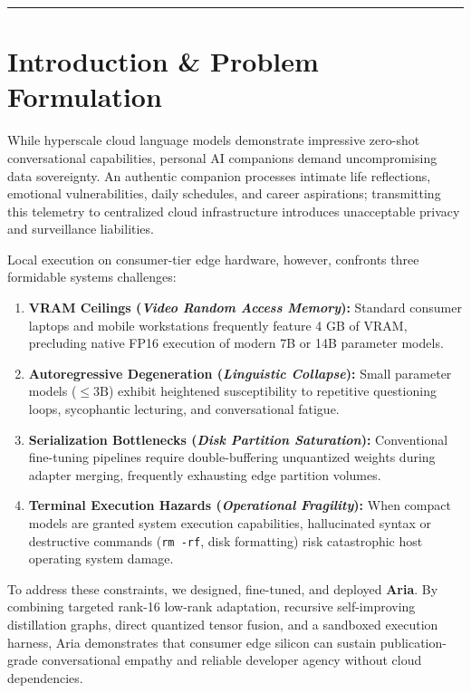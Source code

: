 \documentclass[10pt,a4paper]{article}
\begin{document}
\vspace{3pt}
\hrule
\vspace{5pt}

\section{Introduction \& Problem Formulation}

While hyperscale cloud language models demonstrate impressive zero-shot conversational capabilities, personal AI companions demand uncompromising data sovereignty. An authentic companion processes intimate life reflections, emotional vulnerabilities, daily schedules, and career aspirations; transmitting this telemetry to centralized cloud infrastructure introduces unacceptable privacy and surveillance liabilities. 

Local execution on consumer-tier edge hardware, however, confronts three formidable systems challenges:
\begin{enumerate}
    \item \textbf{VRAM Ceilings (\textit{Video Random Access Memory}):} Standard consumer laptops and mobile workstations frequently feature 4 GB of VRAM, precluding native FP16 execution of modern 7B or 14B parameter models.
    \item \textbf{Autoregressive Degeneration (\textit{Linguistic Collapse}):} Small parameter models ($\le 3\text{B}$) exhibit heightened susceptibility to repetitive questioning loops, sycophantic lecturing, and conversational fatigue.
    \item \textbf{Serialization Bottlenecks (\textit{Disk Partition Saturation}):} Conventional fine-tuning pipelines require double-buffering unquantized weights during adapter merging, frequently exhausting edge partition volumes.
    \item \textbf{Terminal Execution Hazards (\textit{Operational Fragility}):} When compact models are granted system execution capabilities, hallucinated syntax or destructive commands (\texttt{rm -rf}, disk formatting) risk catastrophic host operating system damage.
\end{enumerate}

To address these constraints, we designed, fine-tuned, and deployed \textbf{Aria}. By combining targeted rank-16 low-rank adaptation, recursive self-improving distillation graphs, direct quantized tensor fusion, and a sandboxed execution harness, Aria demonstrates that consumer edge silicon can sustain publication-grade conversational empathy and reliable developer agency without cloud dependencies.
\end{document}
